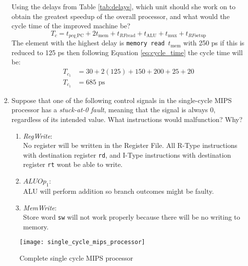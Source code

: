 \documentclass[a4paper]{article}
\begin{document}
\begin{enumerate}
			Using the delays from Table \ref{tab:delays}, which unit should she
			work on to obtain the greatest speedup of the overall processor, and
			what would the cycle time of the improved machine be?\\
			\begin{equation}
				T_c=t_{pcq\_\text{PC}}+2t_{\text{mem}}+t_{RF\text{read}}+t_{\text{ALU}}+t_{\text{mux}}+t_{RF\text{setup}}
				\label{eq:cycle_time}
			\end{equation}
			The element with the highest delay is \texttt{memory read $t_{\text{mem}}$}
			with 250 ps if this is reduced to 125 ps then following Equation 
			\ref{eq:cycle_time} the cycle time will be:
			\begin{align*}
				T_c_1 &= 30 + 2\left( 125 \right) + 150 + 200 + 25 + 20\\
				T_c_1 &= 685 \text{ ps}
			\end{align*}
			
		\item Suppose that one of the following control signals in the single-cycle
			MIPS processor has a \textit{stuck-at-0 fault}, meaning that the
			signal is always $0$, regardless of its intended value. What
			instructions would malfunction? Why?
			\begin{enumerate}
				\item \textit{RegWrite}:\\
					No register will be written in the Register File. All
					R-Type instructions with destination register \texttt{rd},
					and I-Type instructions with destination register
					\texttt{rt} wont be able to write.
				\item $ALUOp_1$:\\
					ALU will perform addition so branch outcomes might 
					be faulty.
				\item \textit{MemWrite}:\\
					Store word \texttt{sw} will not work properly because there
					will be no writing to memory.
			\end{enumerate}
			
	\end{enumerate}
\clearpage
	\begin{figure}[ht!]
		\centering
		\texttt{[image: single\_cycle\_mips\_processor]}
		\caption{Complete single cycle MIPS processor}
		\label{fig:1cycle_processor}
	\end{figure}
\end{document}
